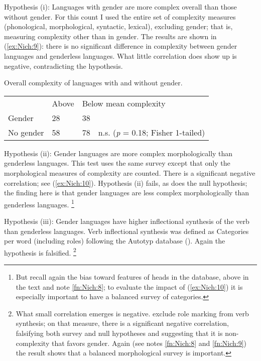 \documentclass[output=collectionpaper]{langsci/langscibook}
\begin{document}
Hypothesis (i): Languages with gender are more complex overall than those without gender. For this count I used the entire set of complexity measures (phonological, morphological, syntactic, lexical), excluding gender; that is, measuring complexity other than in gender. The results are shown in (\ref{ex:Nich:9}): there is no significant difference in complexity between gender languages and genderless languages. What little correlation does show up is negative, contradicting the hypothesis.

\ea
\label{ex:Nich:9}
Overall complexity of languages with and without gender.   \\
\medskip
\begin{tabular}{p{2.7cm}p{1.3cm}p{1.3cm}l}
		 &	Above  &		\multicolumn{2}{l}{Below mean complexity} \\
	Gender &		28		 &38 \\
	No gender	 & 58	 &	78	& n.s. (\textit{p} = 0.18; Fisher 1-tailed) \\
\end{tabular}
\z

Hypothesis (ii): Gender languages are more complex morphologically than genderless languages.  This test uses the same survey except that only the morphological measures of complexity are counted. There is a significant negative correlation; see (\ref{ex:Nich:10}). Hypothesis (ii) fails, as does the null hypothesis; the finding here is that gender languages are less complex morphologically than genderless languages.%
\footnote{%
But recall again the bias toward features of heads in the database, above in the text and note \ref{fn:Nich:8}; to evaluate the impact of (\ref{ex:Nich:10}) it is especially important to have a balanced survey of categories.
}%

%

Hypothesis (iii): Gender languages have higher inflectional synthesis of the verb than genderless languages. Verb inflectional synthesis was defined as Categories per word (including roles) following the Autotyp database (\citealt{Bickel2017}). Again the hypothesis is falsified.%
\footnote{%
What small correlation emerges is negative. \citet{Bickel2013} exclude role marking from verb synthesis; on that measure, there is a significant negative correlation, falsifying both survey and null hypotheses and suggesting that it is non-complexity that favors gender. Again (see notes \ref{fn:Nich:8} and \ref{fn:Nich:9}) the result shows that a balanced morphological survey is important.
}%
\end{document}
